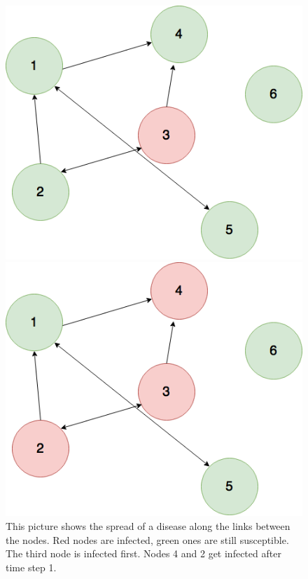 \begin{figure}[htbp]

\begin{minipage}{0.5\textwidth}
\centering
\noindent\includegraphics[width=0.9\linewidth,height=\textheight,
keepaspectratio]{Graph2.png} 
\end{minipage}
\begin{minipage}{0.5\textwidth}
\centering
\noindent\includegraphics[width=0.9\linewidth,height=\textheight,
keepaspectratio]{Graph3.png} 
\end{minipage}
\caption{This picture shows the spread of a disease along the links between the nodes. Red nodes are infected, green ones are still susceptible. The third node is infected first. Nodes 4 and 2 get infected after time step 1.}
\label{fig:disSpreadExampl}
\end{figure}




